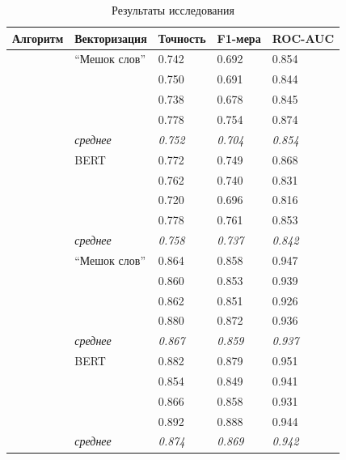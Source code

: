 \begin{table}[H]
	\begin{center}
		\captionsetup{justification=centering}
		\caption{\label{table:result2} Результаты исследования}
		\begin{tabular}{|p{3cm}|p{4cm}|p{2.5cm}|p{2.5cm}|p{2.5cm}|}
				\hline
			Алгоритм & Векторизация & Точность & F1-мера & ROC-AUC \\
				\hline\hline
				
			& ``Мешок слов'' & 0.742 & 0.692 & 0.854 \\
				& & 0.750 & 0.691 & 0.844 \\
				& & 0.738 & 0.678 & 0.845 \\
				& & 0.778 & 0.754 & 0.874 \\
				 & \textit{среднее} & \textit{0.752} & \textit{0.704} & \textit{0.854} \\
			& BERT & 0.772 & 0.749 & 0.868 \\
				& & 0.762 & 0.740 & 0.831 \\
				& & 0.720 & 0.696 & 0.816 \\
				& & 0.778 & 0.761 & 0.853 \\
				 & \textit{среднее} & \textit{0.758} & \textit{0.737} & \textit{0.842} \\
			\hline\hline
			
			& ``Мешок слов'' & 0.864 & 0.858 & 0.947 \\
				& & 0.860 & 0.853 & 0.939 \\
				& & 0.862 & 0.851 & 0.926 \\
				& & 0.880 & 0.872 & 0.936 \\
				 & \textit{среднее} & \textit{0.867} & \textit{0.859} & \textit{0.937} \\
			& BERT & 0.882 & 0.879 & 0.951 \\
				& & 0.854 & 0.849 & 0.941 \\
				& & 0.866 & 0.858 & 0.931 \\
				& & 0.892 & 0.888 & 0.944 \\
				 & \textit{среднее} & \textit{0.874} & \textit{0.869} & \textit{0.942} \\
			\hline\hline
			

\end{tabular}
\end{center}
\end{table}
